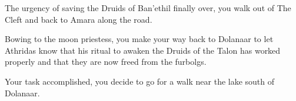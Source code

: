 The urgency of saving the Druids of Ban'ethil finally over, you walk out of The Cleft and back to Amara along the road.


Bowing to the moon priestess, you make your way back to Dolanaar to let Athridas know that his ritual to awaken the Druids of the Talon has worked properly and that they are now freed from the furbolgs.


Your task accomplished, you decide to go for a walk near the lake south of Dolanaar.

